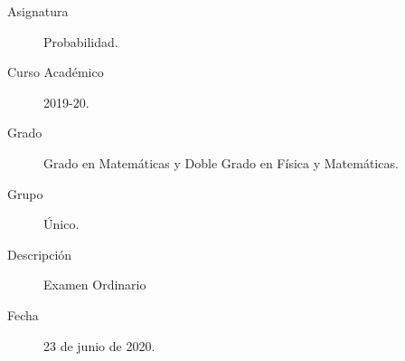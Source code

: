 \documentclass[12pt]{article}
\begin{document}

    
    

    \begin{description}
        \item[Asignatura] Probabilidad.
        \item[Curso Académico] 2019-20.
        \item[Grado] Grado en Matemáticas y Doble Grado en Física y Matemáticas.
        \item[Grupo] Único.
        \item[Descripción] Examen Ordinario 
        \item[Fecha] 23 de junio de 2020.
    
    \end{description}
    \newpage
\end{document}
